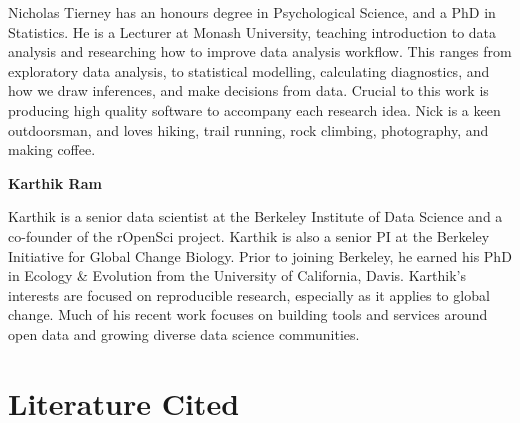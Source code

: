 \documentclass[
]{article}
\begin{document}
Nicholas Tierney has an honours degree in Psychological Science, and a PhD in Statistics. He is a Lecturer at Monash University, teaching introduction to data analysis and researching how to improve data analysis workflow. This ranges from exploratory data analysis, to statistical modelling, calculating diagnostics, and how we draw inferences, and make decisions from data. Crucial to this work is producing high quality software to accompany each research idea. Nick is a keen outdoorsman, and loves hiking, trail running, rock climbing, photography, and making coffee.

\textbf{Karthik Ram}

Karthik is a senior data scientist at the Berkeley Institute of Data Science and a co-founder of the rOpenSci project. Karthik is also a senior PI at the Berkeley Initiative for Global Change Biology. Prior to joining Berkeley, he earned his PhD in Ecology \& Evolution from the University of California, Davis. Karthik's interests are focused on reproducible research, especially as it applies to global change. Much of his recent work focuses on building tools and services around open data and growing diverse data science communities.

\hypertarget{literature-cited}{%
\section*{Literature Cited}\label{literature-cited}}
\end{document}
